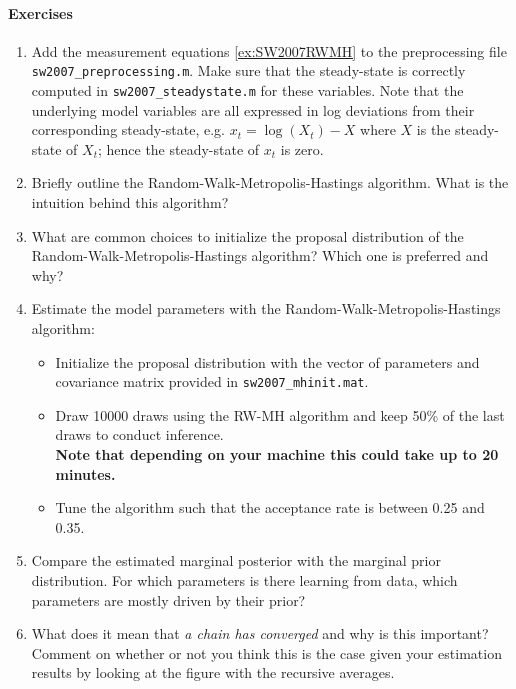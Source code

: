 \documentclass{article}
\begin{document}
\paragraph{Exercises}
	\begin{enumerate}
	\item Add the measurement equations \eqref{ex:SW2007RWMH} to the preprocessing file \texttt{sw2007\_preprocessing.m}. Make sure that the steady-state is correctly computed in \texttt{sw2007\_steadystate.m} for these variables. Note that the underlying model variables are all expressed in log deviations from their corresponding steady-state, e.g. $x_t = \log(X_t) - X$ where $X$ is the steady-state of $X_t$; hence the steady-state of $x_t$ is zero.
	\item Briefly outline the Random-Walk-Metropolis-Hastings algorithm. What is the intuition behind this algorithm?
	\item What are common choices to initialize the proposal distribution of the Random-Walk-Metropolis-Hastings algorithm? Which one is preferred and why?
	\item Estimate the model parameters with the Random-Walk-Metropolis-Hastings algorithm:
	\begin{itemize}
		\item Initialize the proposal distribution with the vector of parameters and covariance matrix provided in \texttt{sw2007\_mhinit.mat}.
		\item Draw 10000 draws using the RW-MH algorithm and keep 50\% of the last draws to conduct inference.\\\textbf{Note that depending on your machine this could take up to 20 minutes.}
		\item Tune the algorithm such that the acceptance rate is between 0.25 and 0.35.
	\end{itemize}	
	\item Compare the estimated marginal posterior with the marginal prior distribution. For which parameters is there learning from data, which parameters are mostly driven by their prior?
	\item What does it mean that \emph{a chain has converged} and why is this important? Comment on whether or not you think this is the case given your estimation results by looking at the figure with the recursive averages.
	
\end{enumerate}

\newpage
\appendix
\printbibliography
\end{document}
